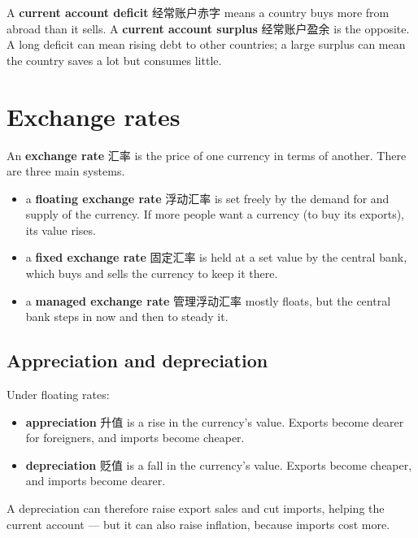 \documentclass[11pt]{article}
\begin{document}
A \textbf{current account deficit} 经常账户赤字 means a country buys more from abroad than it sells. A \textbf{current account surplus} 经常账户盈余 is the opposite. A long deficit can mean rising debt to other countries; a large surplus can mean the country saves a lot but consumes little.

\section*{Exchange rates}

An \textbf{exchange rate} 汇率 is the price of one currency in terms of another. There are three main systems.

\begin{itemize}
\item a \textbf{floating exchange rate} 浮动汇率 is set freely by the demand for and supply of the currency. If more people want a currency (to buy its exports), its value rises.

\item a \textbf{fixed exchange rate} 固定汇率 is held at a set value by the central bank, which buys and sells the currency to keep it there.

\item a \textbf{managed exchange rate} 管理浮动汇率 mostly floats, but the central bank steps in now and then to steady it.

\end{itemize}

\subsection*{Appreciation and depreciation}

Under floating rates:

\begin{itemize}
\item \textbf{appreciation} 升值 is a rise in the currency's value. Exports become dearer for foreigners, and imports become cheaper.

\item \textbf{depreciation} 贬值 is a fall in the currency's value. Exports become cheaper, and imports become dearer.

\end{itemize}

A depreciation can therefore raise export sales and cut imports, helping the current account — but it can also raise inflation, because imports cost more.
\end{document}
